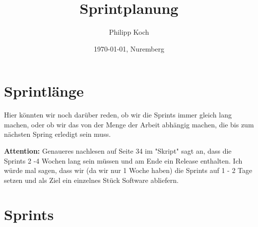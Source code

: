 \documentclass[12pt]{scrartcl}
\title{Sprintplanung}
\author{Philipp Koch}
\date{\today{}, Nuremberg}
\begin{document}
\maketitle

\section{Sprintlänge}
Hier könnten wir noch darüber reden, ob wir die Sprints immer gleich lang machen, oder ob wir das von der Menge der Arbeit abhängig machen, die bis zum nächsten Spring erledigt sein muss.

\textbf{Attention:} Genaueres nachlesen auf Seite 34 im "Skript" sagt an, dass die Sprints 2 -4 Wochen lang sein müssen und am Ende ein Release enthalten. Ich würde mal sagen, dass wir (da wir nur 1 Woche haben) die Sprints auf 1 - 2 Tage setzen und als Ziel ein einzelnes Stück Software abliefern.
\section{Sprints}
\end{document}
